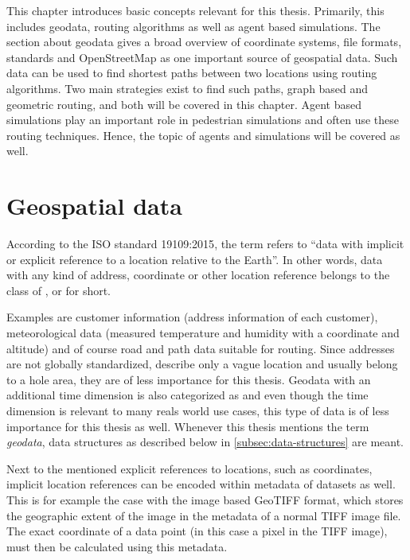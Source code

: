 
This chapter introduces basic concepts relevant for this thesis.
Primarily, this includes geodata, routing algorithms as well as agent based simulations.
The section about geodata gives a broad overview of coordinate systems, file formats, standards and OpenStreetMap as one important source of geospatial data.
Such data can be used to find shortest paths between two locations using routing algorithms.
Two main strategies exist to find such paths, graph based and geometric routing, and both will be covered in this chapter.
Agent based simulations play an important role in pedestrian simulations and often use these routing techniques.
Hence, the topic of agents and simulations will be covered as well.

\section{Geospatial data}

	According to the ISO standard 19109:2015\cite{iso-19109}, the term  refers to \enquote{data with implicit or explicit reference to a location relative to the Earth}.
	In other words, data with any kind of address, coordinate or other location reference belongs to the class of , or  for short.
	
	Examples are customer information (address information of each customer), meteorological data (measured temperature and humidity with a coordinate and altitude) and of course road and path data suitable for routing.
	Since addresses are not globally standardized, describe only a vague location and usually belong to a hole area, they are of less importance for this thesis.
	Geodata with an additional time dimension is also categorized as \cite{iso-19108} and even though the time dimension is relevant to many reals world use cases, this type of data is of less importance for this thesis as well.
	Whenever this thesis mentions the term \emph{geodata}, data structures as described below in \cref{subsec:data-structures} are meant.
	
	Next to the mentioned explicit references to locations, such as coordinates, implicit location references can be encoded within metadata of datasets as well.
	This is for example the case with the image based GeoTIFF format, which stores the geographic extent of the image in the metadata of a normal TIFF image file\cite{ogc-geotiff}.
	The exact coordinate of a data point (in this case a pixel in the TIFF image), must then be calculated using this metadata.

